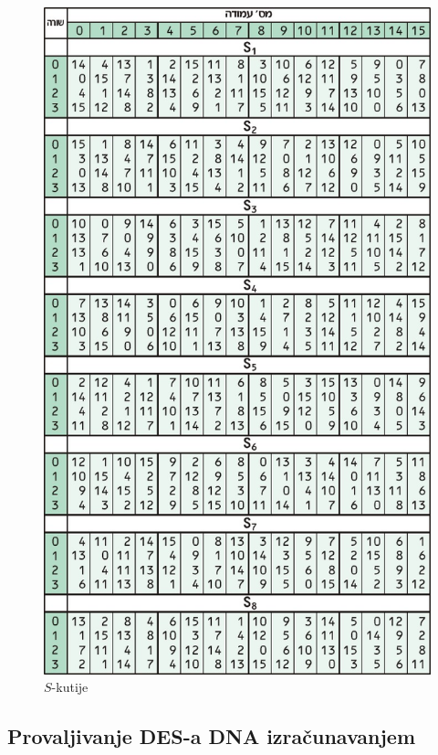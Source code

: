 \documentclass[a4paper,oneside,12pt]{memoir} %
\begin{document}
\begin{spacing}{1.5}
\begin{figure}[h]
\centering \includegraphics[scale=0.52]{S-box.jpg}
\caption{$S$-kutije}
\label{fig:sbox}
\end{figure}
 \newpage
\subsection{Provaljivanje DES-a DNA izračunavanjem}

\end{spacing}
\end{document}
